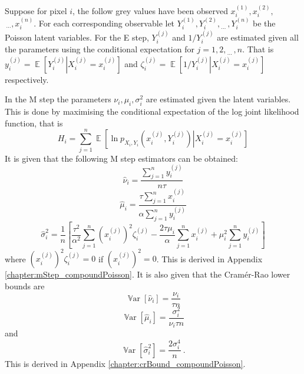 \documentclass[12pt]{report}
\DeclareMathOperator{\expectation}{\mathbb{E}}
\DeclareMathOperator{\variance}{\mathbb{V}ar}
\newcommand{\dotdotdot}{_{\phantom{.}\cdots}}
\begin{document}
Suppose for pixel $i$, the follow grey values have been observed $x_i^{(1)},x_i^{(2)},$ $\dotdotdot,x_i^{(n)}$. For each corresponding observable let $Y_i^{(1)},Y_i^{(2)},\dotdotdot,Y_i^{(n)}$ be the Poisson latent variables. For the E step, $Y_i^{(j)}$ and $1/Y_i^{(j)}$ are estimated given all the parameters using the conditional expectation for $j=1,2,\dotdotdot,n$. That is $y_i^{(j)}=\expectation\left[Y_i^{(j)}\right|\left.X_i^{(j)}=x_i^{(j)}\right]$ and $\zeta_i^{(j)}=\expectation\left[1/Y_i^{(j)}\right|\left.X_i^{(j)}=x_i^{(j)}\right]$ respectively. 

In the M step the parameters $\nu_i,\mu_i,\sigma_i^2$ are estimated given the latent variables. This is done by maximising the conditional expectation of the log joint likelihood function, that is
\begin{equation}
H_i=\sum_{j=1}^n\expectation\left[\ln p_{X_i,Y_i}\left(x_i^{(j)},Y_i^{(j)}\right)\right|\left.X_i^{(j)}=x_i^{(j)}\right]
\end{equation}
It is given that the following M step estimators can be obtained:
\begin{equation}
\widehat{\nu}_i=\frac{\sum_{j=1}^ny_i^{(j)}}{n\tau}
\end{equation}
\begin{equation}
\widehat{\mu}_i=\frac{\tau\sum_{j=1}^nx_i^{(j)}}{\alpha\sum_{j=1}^ny_i^{(j)}}
\end{equation}
\begin{equation}
\widehat{\sigma}_i^2=\frac{1}{n}\left[
\frac{\tau^2}{\alpha^2}\sum_{j=1}^n\left(x_i^{(j)}\right)^2\zeta_i^{(j)}
-\frac{2\tau\mu_i}{\alpha}\sum_{j=1}^nx_i^{(j)}
+\mu_i^2\sum_{j=1}^ny_i^{(j)}
\right]
\end{equation}
where $\left(x_i^{(j)}\right)^2\zeta_i^{(j)}=0$ if $\left(x_i^{(j)}\right)^2=0$. This is derived in Appendix \ref{chapter:mStep_compoundPoisson}. It is also given that the Cram\'er-Rao lower bounds \cite{cramer1945mathematical} are
\begin{equation}
\variance\left[\widehat{\nu}_i\right]=\frac{\nu_i}{\tau n}
\end{equation}
\begin{equation}
\variance\left[\widehat{\mu}_i\right]=\frac{\sigma_i^2}{\nu_i\tau n}
\end{equation}
and
\begin{equation}
\variance\left[\widehat{\sigma}_i^2\right]=\frac{2\sigma_i^4}{n} \ .
\end{equation}
This is derived in Appendix \ref{chapter:crBound_compoundPoisson}.
\end{document}
